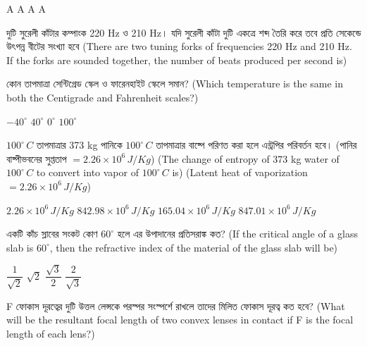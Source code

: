 \documentclass[addpoints]{exam}
\begin{document}
\begin{questions}
\begin{oneparchoices}
 A
 A
 A
 A
\end{oneparchoices}

\question  দুটি সুরেলী কাঁটার কম্পাংক 220 Hz ও 210 Hz। যদি সুরেলী কাঁটা দুটি একত্রে  শব্দ তৈরি করে তবে প্রতি সেকেন্ডে উৎপন্ন বীটের সংখ্যা হবে (There are two tuning forks of frequencies 220 Hz and 210 Hz. If the forks are sounded together, the number of beats produced per second is)

\begin{oneparchoices}

\end{oneparchoices}


\question  কোন তাপমাত্রা সেন্টিগ্রেড স্কেল ও ফারেনহাইট স্কেলে সমান? (Which temperature is the same in both the Centigrade and Fahrenheit scales?)

\begin{oneparchoices}
\choice $ -40^{\circ}$
\choice $ 40^{\circ} $
\choice $ 0^{\circ} $
\choice  $ 100^{\circ} $
\end{oneparchoices}



\question $ 100^{\circ}\,C $ তাপমাত্রার 373 kg পানিকে $ 100^{\circ}\,C $  তাপমাত্রার বাষ্পে পরিণত করা হলে এন্ট্রপির পরিবর্তন হবে। (পানির বাষ্পীভবনের সুপ্ততাপ $ = 2.26\times 10^{6}\,J/Kg $) (The change of entropy of 373 kg water of $ 100^{\circ}\,C $ to convert into vapor of $ 100^{\circ}\,C $ is) (Latent heat of vaporization $ = 2.26\times 10^{6}\,J/Kg $)

\begin{oneparchoices}
\choice $ 2.26\times 10^{6}\,J/Kg $
\choice $ 842.98\times 10^{6}\,J/Kg $
\choice $ 165.04\times 10^{6}\,J/Kg $
\choice $ 847.01\times 10^{6}\,J/Kg $
\end{oneparchoices}

\question  একটি কাঁচ স্লাবের সংকট কোণ $ 60^{\circ} $ হলে এর উপাদানের প্রতিসরাঙ্ক কত? (If the critical angle of a glass slab is $ 60^{\circ} $, then the refractive index of the  material of the glass slab will be)

\begin{oneparchoices}
\choice $ \dfrac{1}{\sqrt{2}} $
\choice $ \sqrt{2} $
\choice $ \dfrac{\sqrt{3}}{2} $
\choice $ \dfrac{2}{\sqrt{3}} $
\end{oneparchoices}

\question   F ফোকাস দূরত্বের দুটি উত্তল লেন্সকে পরস্পর সংস্পর্শে রাখলে তাদের মিলিত ফোকাস দূরত্ব কত হবে? (What will be the resultant focal length of two convex lenses in contact if F is the focal length of each lens?)


\end{questions}
\end{document}
